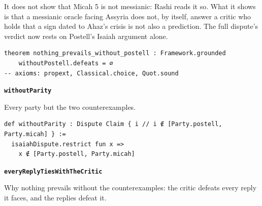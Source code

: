 \documentclass[11pt]{article}
\begin{document}
It does not show that Micah 5 is not messianic: Rashi reads it so. What it shows is that a messianic oracle facing Assyria does not, by itself, answer a critic who holds that a sign dated to Ahaz’s crisis is not also a prediction. The full dispute’s verdict now rests on Postell’s Isaiah argument alone.

{\small\begin{verbatim}
theorem nothing_prevails_without_postell : Framework.grounded
    withoutPostell.defeats = ∅
-- axioms: propext, Classical.choice, Quot.sound
\end{verbatim}}
\par\medskip\noindent\textbf{\texttt{without\allowbreak{}Parity}}\par\nobreak\noindent
Every party but the two counterexamples.

{\small\begin{verbatim}
def withoutParity : Dispute Claim { i // i ∉ [Party.postell, Party.micah] } :=
  isaiahDispute.restrict fun x =>
    x ∉ [Party.postell, Party.micah]
\end{verbatim}}
\par\medskip\noindent\textbf{\texttt{every\allowbreak{}Reply\allowbreak{}Ties\allowbreak{}With\allowbreak{}The\allowbreak{}Critic}}\par\nobreak\noindent
Why nothing prevails without the counterexamples: the critic defeats every reply it faces, and the replies defeat it.
\end{document}
